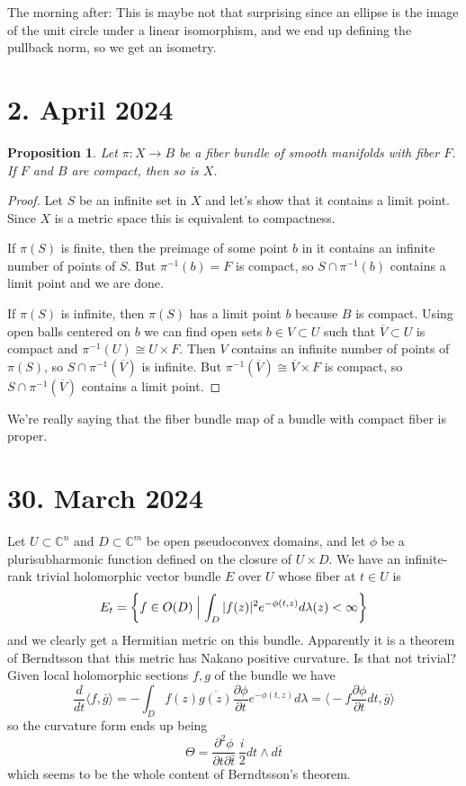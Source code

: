 \documentclass[11pt]{amsart}
\newtheorem{prop}[theo]{Proposition}
\theoremstyle{definition}
\newcommand{\kk}[1]{\mathbb{#1}}
\def\ov#1{\overline{#1}}
\def\<{\langle}
\def\>{\rangle}
\begin{document}
The morning after: This is maybe not that surprising since an ellipse is the
image of the unit circle under a linear isomorphism, and we end up defining the
pullback norm, so we get an isometry.


\section{2. April 2024}

\begin{prop}
Let $\pi : X \to B$ be a fiber bundle of smooth manifolds with fiber $F$.
If $F$ and $B$ are compact, then so is $X$.
\end{prop}

\begin{proof}
Let $S$ be an infinite set in $X$
and let's show that it contains a limit point.
Since $X$ is a metric space this is equivalent to compactness.

If $\pi(S)$ is finite, then the preimage of some point $b$ in it contains an
infinite number of points of $S$. But $\pi^{-1}(b) = F$ is compact, so $S \cap
\pi^{-1}(b)$ contains a limit point and we are done.

If $\pi(S)$ is infinite, then $\pi(S)$ has a limit point $b$ because $B$ is
compact.
Using open balls centered on $b$ we can find open sets $b \in V
\subset U$ such that $\ov V \subset U$ is compact and $\pi^{-1}(U) \cong U
\times F$.
Then $V$ contains an infinite number of points of $\pi(S)$, so $S
\cap \pi^{-1}(\ov V)$ is infinite.
But $\pi^{-1}(\ov V) \cong \ov V \times F$ is compact, so 
$S \cap \pi^{-1}(\ov V)$ contains a limit point.
\end{proof}

We're really saying that the fiber bundle map of a bundle with compact fiber is
proper.


\section{30. March 2024}

Let $U \subset \kk C^n$ and $D \subset \kk C^m$ be open pseudoconvex domains,
and let $\phi$ be a plurisubharmonic function defined on the closure of $U
\times D$.
We have an infinite-rank trivial holomorphic vector bundle $E$ over $U$ whose
fiber at $t \in U$ is
\[
E_t = \biggl\{
f \in O(D) 
\Bigm|
\int_{D} |f(z)|^2 e^{-\phi(t, z)} d\lambda(z) < \infty
\biggr\}
\]
and we clearly get a Hermitian metric on this bundle.
Apparently it is a theorem of Berndtsson that this metric has Nakano positive curvature.
Is that not trivial?
Given local holomorphic sections $f,g$ of the bundle we have
$$
\frac{d}{dt} \< f, \bar g \>
= - \int_D f(z) \ov{g(z)} \frac{\partial \phi}{\partial t} e^{-\phi(t,z)} d\lambda
= \biggl\< -f \frac{\partial \phi}{\partial t} dt , \bar g \biggr\>
$$
so the curvature form ends up being
$$
\Theta =
\frac{\partial^2 \phi}{\partial t \partial \bar t}  \,
\frac i2 dt \wedge d\bar t
$$
which seems to be the whole content of Berndtsson's theorem.
\end{document}
